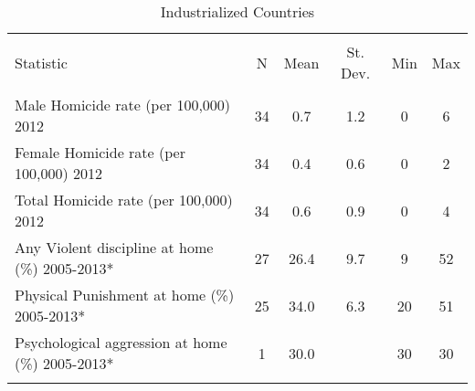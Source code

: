 
\begin{table}[!htbp] \centering 
  \caption{Industrialized Countries} 
  \label{} 
\begin{tabular}{@{\extracolsep{5pt}}lccccc} 
\\[-1.8ex]\hline 
\hline \\[-1.8ex] 
Statistic & \multicolumn{1}{c}{N} & \multicolumn{1}{c}{Mean} & \multicolumn{1}{c}{St. Dev.} & \multicolumn{1}{c}{Min} & \multicolumn{1}{c}{Max} \\ 
\hline \\[-1.8ex] 
Male Homicide rate (per 100,000) 2012 & 34 & 0.7 & 1.2 & 0 & 6 \\ 
Female Homicide rate (per 100,000)  2012 & 34 & 0.4 & 0.6 & 0 & 2 \\ 
Total Homicide rate (per 100,000)  2012 & 34 & 0.6 & 0.9 & 0 & 4 \\ 
Any Violent discipline at home (\%) 2005-2013* & 27 & 26.4 & 9.7 & 9 & 52 \\ 
Physical Punishment at home (\%) 2005-2013* & 25 & 34.0 & 6.3 & 20 & 51 \\ 
Psychological aggression at home (\%) 2005-2013* & 1 & 30.0 &  & 30 & 30 \\ 
\hline \\[-1.8ex] 
\end{tabular} 
\end{table} 
